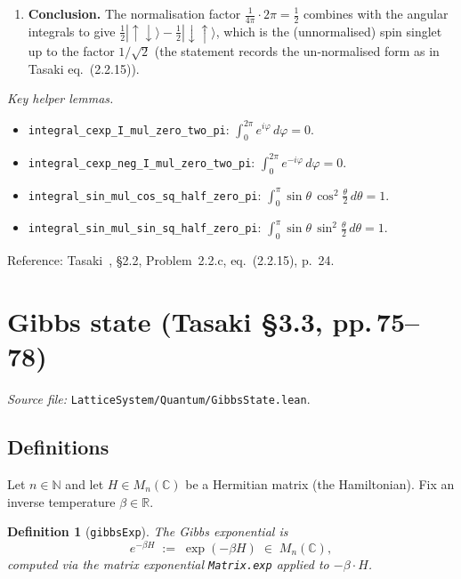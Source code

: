 \documentclass[a4paper,11pt]{article}
\newtheorem{definition}[theorem]{Definition}
\begin{document}
\begin{itemize}
\begin{enumerate}
  \item \textbf{Conclusion.}
    The normalisation factor $\tfrac{1}{4\pi}\cdot 2\pi = \tfrac{1}{2}$
    combines with the angular integrals to give
    $\tfrac{1}{2}|\!\uparrow\downarrow\rangle - \tfrac{1}{2}|\!\downarrow\uparrow\rangle$,
    which is the (unnormalised) spin singlet up to the factor
    $1/\sqrt{2}$ (the statement records the un-normalised form as
    in Tasaki eq.~(2.2.15)).
  \end{enumerate}

  \textit{Key helper lemmas.}
  \begin{itemize}
    \item \texttt{integral\_cexp\_I\_mul\_zero\_two\_pi}:
      $\int_0^{2\pi}e^{i\varphi}\,d\varphi = 0$.
    \item \texttt{integral\_cexp\_neg\_I\_mul\_zero\_two\_pi}:
      $\int_0^{2\pi}e^{-i\varphi}\,d\varphi = 0$.
    \item \texttt{integral\_sin\_mul\_cos\_sq\_half\_zero\_pi}:
      $\int_0^\pi\sin\theta\,\cos^2\!\tfrac{\theta}{2}\,d\theta = 1$.
    \item \texttt{integral\_sin\_mul\_sin\_sq\_half\_zero\_pi}:
      $\int_0^\pi\sin\theta\,\sin^2\!\tfrac{\theta}{2}\,d\theta = 1$.
  \end{itemize}

  Reference: Tasaki~\cite{Tasaki:QMB}, §2.2, Problem~2.2.c,
  eq.~(2.2.15), p.~24.
\end{itemize}

\section{Gibbs state (Tasaki §3.3, pp.\,75--78)}
\label{sec:gibbs}

\emph{Source file:} \texttt{LatticeSystem/Quantum/GibbsState.lean}.

\subsection{Definitions}

Let $n \in \mathbb{N}$ and let $H \in M_n(\mathbb{C})$ be a Hermitian matrix
(the Hamiltonian). Fix an inverse temperature $\beta \in \mathbb{R}$.

\begin{definition}[\texttt{gibbsExp}]
The \emph{Gibbs exponential} is
\[
  e^{-\beta H} \;:=\; \exp(-\beta H)
  \;\in\; M_n(\mathbb{C}),
\]
computed via the matrix exponential \texttt{Matrix.exp} applied to
$-\beta \cdot H$.
\end{definition}
\end{document}
